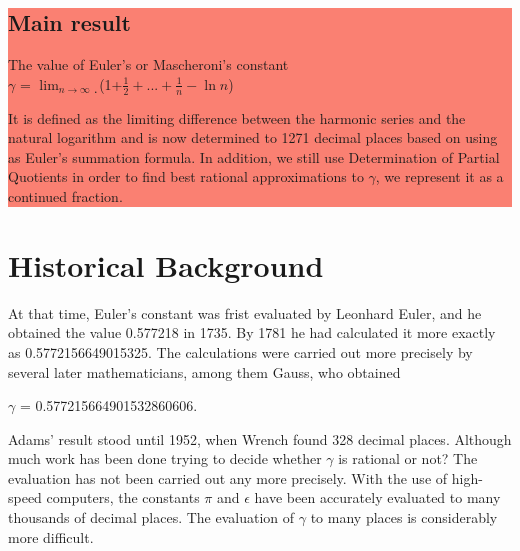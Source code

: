 \documentclass{article}
\def\to{\rightarrow}
\begin{document}
	\setlength{\columnsep}{1cm}
	\begin{multicols}{3}
		\noindent
		\colorbox{salmon}{
			\begin{minipage}[t]{.96\linewidth}
				\vspace{.05cm}
				\begin{center}
					\vspace{.2cm}
					\section*{\Huge Main result}
					\Large The value of Euler's or Mascheroni's constant \\
					$\gamma$  =  $\lim_{n\to\infty}$ ̣(1+$\frac{1}{2}+...+\frac{1}{n}-\ln{n}$) 
				\end{center}
				
				\Large It is defined as the limiting difference between the harmonic series and the natural logarithm and is now determined to 1271 decimal places based on using  as Euler's summation formula. In addition, we still use Determination of Partial Quotients in order to find best rational approximations to $\gamma$, we represent it as a continued fraction. 
				\vspace{.1cm}
			\end{minipage}
		}
		\vspace{-0.5cm}
		\section*{Historical Background}
		\begin{minipage}[t]{.96\linewidth}
                \vspace{-0.5cm}  
			\Large At that time, Euler's constant was frist evaluated by Leonhard Euler, and he obtained the value 0.577218 in 1735. By 1781 he had calculated it more exactly as 0.5772156649015325. The calculations were carried out more precisely by several later mathematicians, among them Gauss, who obtained
			\begin{center}
				$\gamma$ = 0.577215664901532860606.    
			\end{center}
			\Large Adams' result stood until 1952, when Wrench found 328 decimal places.
			Although much work has been done trying to decide whether $\gamma$ is  rational or not? The
			evaluation has not been carried out any more precisely. With the use of high-speed
			computers, the constants $\pi$ and $\epsilon$ have been accurately evaluated to many thousands of decimal places. The evaluation of $\gamma$ to many places is considerably more difficult.
		\end{minipage}



\end{multicols}
\end{document}

